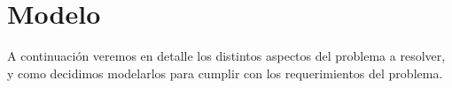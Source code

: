 \section{Modelo}

A continuación veremos en detalle los distintos aspectos del problema a resolver, y como decidimos modelarlos para cumplir con los requerimientos del problema.
